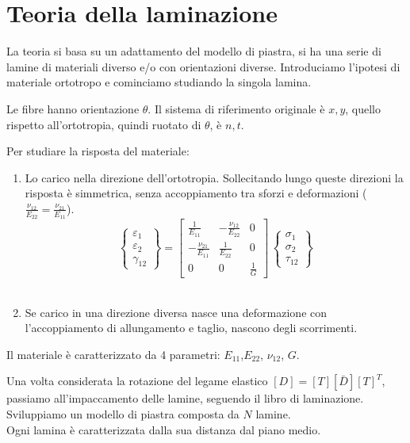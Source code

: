 \section{Teoria della laminazione}

La teoria si basa su un adattamento del modello di piastra, si ha una serie di lamine di materiali diverso e/o con orientazioni diverse.
Introduciamo l'ipotesi di materiale ortotropo e cominciamo studiando la singola lamina.

Le fibre hanno orientazione $\theta$. Il sistema di riferimento originale è $x, y$, quello rispetto all'ortotropia, quindi ruotato di   $\theta$, è $n, t$.

Per studiare la risposta del materiale:
\begin{enumerate}
    \item Lo carico nella direzione dell'ortotropia. Sollecitando lungo queste direzioni la risposta è simmetrica, senza accoppiamento tra sforzi e deformazioni ($\frac{\nu_{12}}{E_{22}}=\frac{\nu_{21}}{E_{11}}$).
    \begin{equation*}
\left\{
\begin{array}{c}
\varepsilon_{1} \\
\varepsilon_{2} \\
\gamma_{12}
\end{array}
\right\}
=
\left[
\begin{array}{ccc}
\displaystyle \frac{1}{E_{11}} & \displaystyle-\frac{\nu_{12}}{E_{22}} & 0\\
\displaystyle -\frac{\nu_{21}}{E_{11}} & \displaystyle\frac{1}{E_{22}} &0 \\
0& 0 & \displaystyle\frac{1}{G}
\end{array}
\right]\,
\left\{
\begin{array}{c}
\sigma_{1} \\
\sigma_{2} \\
\tau_{12}
\end{array}
\right\}
\end{equation*}
    \\
    \item Se carico in una direzione diversa nasce una deformazione con l'accoppiamento di allungamento e taglio, nascono degli scorrimenti.
\end{enumerate}

Il materiale è caratterizzato da 4 parametri:  $E_{11}$,$E_{22}$,  $\nu_{12}$,  $G$.

Una volta considerata la rotazione del legame elastico $[D] =  \left[T\right][\bar{D}]\left[T\right]^T$, passiamo all'impaccamento delle lamine, seguendo il libro di laminazione.\\ Sviluppiamo un modello di piastra composta da $N$ lamine. \\ Ogni lamina è caratterizzata dalla sua distanza dal piano medio.

